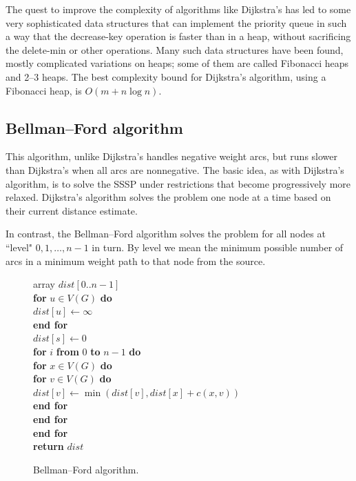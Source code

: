 The quest to improve the complexity of algorithms like Dijkstra's has
led to some very sophisticated data structures that can implement the
priority queue in such a way that the decrease-key operation is faster
than in a heap, without sacrificing the delete-min or other operations.
Many such data structures have been found, mostly complicated variations
on heaps; some of them are called Fibonacci heaps and 2--3 heaps. The
best complexity bound for Dijkstra's algorithm, using a Fibonacci heap,
is $O(m + n\log n)$.

\subsection{Bellman--Ford algorithm}
\label{subsec:bellford}

This algorithm, unlike Dijkstra's handles negative weight arcs, but runs
slower than Dijkstra's when all arcs are nonnegative. The basic idea,
as with Dijkstra's algorithm, is to solve the SSSP under  restrictions
that become progressively more relaxed. Dijkstra's algorithm solves the
problem one node at a time based on their current distance estimate.

In contrast, the Bellman--Ford algorithm solves the problem for all
nodes at ``level" $0, 1, \dots , n-1$ in turn. By level we mean the
minimum possible number of arcs in a minimum weight path to that node from the
source.

\begin{figure}
\hspace*{1in}\begin{minipage}{5in}
{
\> array $dist[0..n-1]$ \\
\> \textbf{for} $u \in V(G)$ \textbf{do} \\
\> \> $dist[u] \gets \infty$ \\
\> \textbf{end for} \\
\> $dist[s] \gets 0$ \\
\> \textbf{for} $i$ \textbf{from} $0$ \textbf{to} $n-1$ \textbf{do} \\
\> \> \textbf{for} $x \in V(G)$ \textbf{do}\\
\> \> \> \textbf{for} $v \in V(G)$ \textbf{do}\\
\> \> \> \> $dist[v] \gets \min( dist[v], dist[x] + c(x,v) )$ \\
\> \> \> \textbf{end for} \\
\> \> \textbf{end for} \\
\> \textbf{end for}\\
\> \textbf{return} $dist$ \\
}
\end{minipage}
\caption{Bellman--Ford algorithm.}
\label{fig:bellford-code}
\end{figure}

